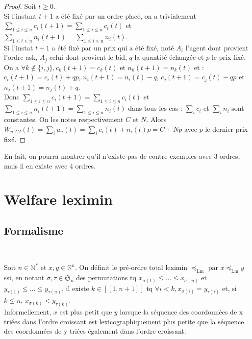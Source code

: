 \documentclass[a4paper]{article}
\newcommand{\N}{\mathbb{N}}
\newcommand{\R}{\mathbb{R}}
\newcommand{\Sg}{\mathfrak{S}}
\newcommand{\Lm}{\preceq_\mathrm{Lm}} %
\newtheorem[style=S, bodystyle=\noindent]{thm}{Théorème}[section]
\newtheorem[style=S, bodystyle=\noindent]{defn}[thm]{Définition}
\newtheorem[style=S, bodystyle=\noindent]{propo}[thm]{Proposition}
\newtheorem[style=S, bodystyle=\noindent]{prop}[thm]{Propriété}
\newtheorem[style=S, bodystyle=\noindent]{coro}[thm]{Corollaire}
\newtheorem[style=S, bodystyle=\noindent]{lem}[thm]{Lemme}
\newtheorem[style=S, headstyle=\bfseries\boldmath Théorème, bodystyle=\noindent]{thm*}{Théorème}
\newtheorem[style=S, headstyle=\bfseries\boldmath Définition, bodystyle=\noindent]{defn*}{Définition}
\newtheorem[style=S, headstyle=\bfseries\boldmath Proposition, bodystyle=\noindent]{propo*}{Proposition}
\newtheorem[style=S, headstyle=\bfseries\boldmath Propriété, bodystyle=\noindent]{prop*}{Propriété}
\newtheorem[style=S, headstyle=\bfseries\boldmath Corollaire, bodystyle=\noindent]{coro*}{Corollaire}
\newtheorem[style=S, headstyle=\bfseries\boldmath Lemme, bodystyle=\noindent]{lem*}{Lemme}
\begin{document}
\begin{proof}
	Soit $t \geq 0$.\\
	Si l'instant $t+1$ a été fixé par un ordre placé, on a trivialement $\sum_{1\leq i\leq n}c_i(t+1) = \sum_{1\leq i\leq n}c_i(t)$ et $\sum_{1\leq i\leq n}n_i(t+1) = \sum_{1\leq i\leq n}n_i(t)$. \\
	Si l'instat $t+1$ a été fixé par un prix qui a été fixé, noté $A_i$ l'agent dont provient l'ordre ask, $A_j$ celui dont provient le bid, $q$ la quantité échangée et $p$ le prix fixé. On a $\forall k \not\in \{i,j\}, c_k(t+1) = c_k(t)$ et $n_k(t+1) = n_k(t)$ et : \\
	$c_i(t+1) = c_i(t) + qp$, $n_i(t+1) = n_i(t) - q$, $c_j(t+1) = c_j(t) - qp$ et $n_j(t+1) = n_j(t) + q$. \\
	Donc $\sum_{1\leq i\leq n}c_i(t+1) = \sum_{1\leq i\leq n}c_i(t)$ et $\sum_{1\leq i\leq n}n_i(t+1) = \sum_{1\leq i\leq n}n_i(t)$ dans tous les cas : $\sum_ic_i$ et $\sum_in_i$ sont constantes. On les notes respectivement $C$ et $N$.
	Alors $W_{u,CI}(t) = \sum_iw_i(t) = \sum_i c_i(t) + n_i(t)p = C + Np$ avec $p$ le dernier prix fixé.
\end{proof}

En fait, on pourra montrer qu'il n'existe pas de contre-exemples avec 3 ordres, mais il en existe avec 4 ordres.

\section{Welfare leximin}

\subsection{Formalisme}
~
\begin{defn}
	Soit $n\in\N^*$ et $x,y \in \R^n$. On définit le pré-ordre total leximin $\Lm$ par $x \Lm y$ ssi, en notant $\sigma, \tau \in \Sg_n$ des permutations tq $x_{\sigma(1)} \leq \ldots \leq x_{\sigma(n)}$ et $y_{\tau(1)} \leq \ldots \leq y_{\tau(n)}$, il existe $k \in [\![1,n+1]\!]$ tq $\forall i < k, x_{\sigma(i)} = y_{\tau(i)}$ et, si $k \leq n$, $x_{\sigma(k)} < y_{\tau(k)}$. \\
	Informellement, $x$ est plus petit que $y$ lorsque la séquence des coordonnées de x triées dans l'ordre croissant est lexicographiquement plus petite que la séquence des coordonnées de y triées également dans l'ordre croissant.
\end{defn}
\end{document}
